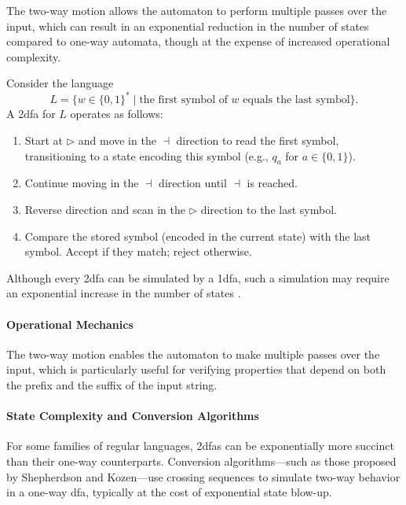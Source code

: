 \begin{remark}
The two-way motion allows the automaton to perform multiple passes over the input, which can result in an exponential reduction in the number of states compared to one-way automata, though at the expense of increased operational complexity.
\end{remark}

\begin{example}
    Consider the language 
    \[
    L = \{ w\in \{0,1\}^* \mid \text{the first symbol of } w \text{ equals the last symbol} \}.
    \]
    A \gls{2dfa} for \(L\) operates as follows:
    \begin{enumerate}
      \item Start at \(\triangleright\) and move in the \(\dashv\) direction to read the first symbol, transitioning to a state encoding this symbol (e.g., \(q_a\) for \(a \in \{0,1\}\)).
      \item Continue moving in the \(\dashv\) direction until \(\dashv\) is reached.
      \item Reverse direction and scan in the \(\triangleright\) direction to the last symbol.
      \item Compare the stored symbol (encoded in the current state) with the last symbol. Accept if they match; reject otherwise.
    \end{enumerate}
\end{example}

\begin{observation}
    Although every \gls{2dfa} can be simulated by a \gls{1dfa}, such a simulation may require an exponential increase in the number of states \cite{shepherdson1959reduction}.
\end{observation}

\paragraph{Operational Mechanics}
The two-way motion enables the automaton to make multiple passes over the input, which is particularly useful for verifying properties that depend on both the prefix and the suffix of the input string.

\paragraph{State Complexity and Conversion Algorithms}
For some families of regular languages, \glspl{2dfa} can be exponentially more succinct than their one-way counterparts. Conversion algorithms—such as those proposed by Shepherdson and Kozen—use crossing sequences to simulate two-way behavior in a one-way \gls{dfa}, typically at the cost of exponential state blow-up.

